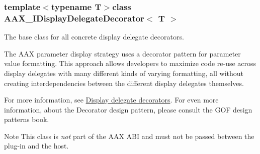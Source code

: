 \subsubsection*{template$<$typename T$>$class A\+A\+X\+\_\+\+I\+Display\+Delegate\+Decorator$<$ T $>$}

The base class for all concrete display delegate decorators. 

The A\+A\+X parameter display strategy uses a decorator pattern for parameter value formatting. This approach allows developers to maximize code re-\/use across display delegates with many different kinds of varying formatting, all without creating interdependencies between the different display delegates themselves.

For more information, see \hyperlink{a00346_displaydelegates_decorators}{Display delegate decorators}. For even more information, about the Decorator design pattern, please consult the G\+O\+F design patterns book.

\begin{DoxyNote}{Note}
This class is {\itshape not} part of the A\+A\+X A\+B\+I and must not be passed between the plug-\/in and the host. 
\end{DoxyNote}
